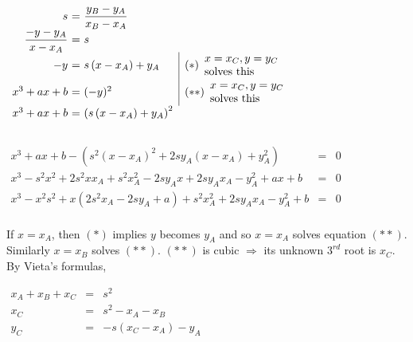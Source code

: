 \begin{frame}[t]
\begin{columns}[T]
$
\begin{array}{r@{~}c@{~}l@{}l|l}
s&=&\displaystyle \frac{y_B-y_A}{x_B-x_A}\\
\displaystyle \frac{-y - y_A}{x-x_A}&=& s \\
-y&=& s\left(x-x_A\right) + y_A  && (*) \begin{array}{l}x=x_C, y=y_C\\ \text{solves this} \end{array}\\
x^3+a x +b  &=& (-y)^2  && (**)\begin{array}{l}x=x_C, y=y_C\\ \text{solves this} \end{array}\\
x^3 + a x + b &=& \left(s\left(x-x_A\right) + y_A\right)^2\\
\end{array}
$
\end{columns}
$
\begin{array}{rcl}
x^3+ax+b - \left(s^2 (x-x_A)^2 + 2s y_A(x-x_A) +y_A^2\right)&=&0\\
x^3 - s^2x^2+2s^2xx_A +s^2x_A^2-2sy_Ax + 2sy_Ax_A -y_A^2+ax+b &=&0\\
x^3 - x^2s^2 + x(2s^2 x_A-2sy_A+a) + s^2x_A^2+2sy_Ax_A-y_A^2+b &=& 0\\
\end{array}
$

If $x=x_A$, then $(*)$ implies $y$ becomes $y_A$ and so $x=x_A$ solves equation $(**)$. Similarly $x=x_B$ solves $(**)$. $(**)$ is cubic $\Rightarrow$ its unknown $3^{rd}$ root is $x_C$. By Vieta's formulas, 

$
\begin{array}{rcl}
x_A+x_B+x_C &=&s^2\\
x_C &=& s^2- x_A-x_B \\
y_C &=& -s(x_C-x_A)-y_A
\end{array}
$
\end{frame}
